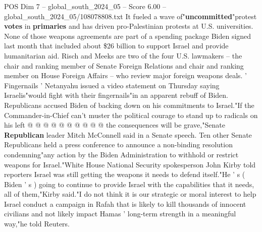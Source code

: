 \begin{textsample}{POS Dim 7 – global\_south\_2024\_05 – Score 6.00 – global\_south\_2024\_05/108078808.txt}
It fueled a wave of"\textbf{uncommitted}"protest \textbf{votes} in \textbf{primaries} and has driven pro-Palestinian protests at U.S. universities.
None of those weapons agreements are part of a spending package Biden signed last month that included about \$26 billion to support Israel and provide humanitarian aid.
Risch and Meeks are two of the four U.S. lawmakers -- the chair and ranking member of Senate Foreign Relations and chair and ranking member on House Foreign Affairs -- who review major foreign weapons deals. ' Fingernails ' Netanyahu issued a video statement on Thursday saying Israelis"would fight with their fingernails"in an apparent rebuff of Biden.
Republicans accused Biden of backing down on his commitments to Israel."If the Commander-in-Chief can't muster the political courage to stand up to radicals on his left @ @ @ @ @ @ @ @ @ @ the consequences will be grave,"Senate \textbf{Republican} leader Mitch McConnell said in a Senate speech.
Ten other Senate Republicans held a press conference to announce a non-binding resolution condemning"any action by the Biden Administration to withhold or restrict weapons for Israel."White House National Security spokesperson John Kirby told reporters Israel was still getting the weapons it needs to defend itself."He ' s ( Biden ' s ) going to continue to provide Israel with the capabilities that it needs, all of them,"Kirby said."I do not think it is our strategic or moral interest to help Israel conduct a campaign in Rafah that is likely to kill thousands of innocent civilians and not likely impact Hamas ' long-term strength in a meaningful way,"he told Reuters.

\end{textsample}
